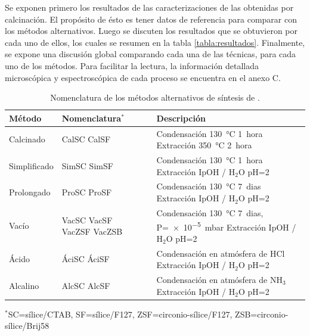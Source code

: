 	 Se exponen primero los resultados de las caracterizaciones de las \pdm\space obtenidas por calcinación. El propósito de ésto es tener datos de referencia para comparar con los métodos alternativos. Luego se discuten los resultados que se obtuvieron por cada uno de ellos, los cuales se resumen en la tabla \ref{tabla:resultados}. Finalmente, se expone una discusión global comparando cada una de las técnicas, para cada uno de los métodos. Para facilitar la lectura, la información detallada microscópica y espectroscópica de cada proceso se encuentra en el anexo C.
	 
	  	 \begin{table}[h!] 
		 	 \caption[Tratamientos alternativos de síntesis de \pdm]{Nomenclatura de los métodos alternativos de síntesis de \pdm.}
			 \begin{tabular}{>{\raggedright\arraybackslash}m{1.9cm}>{\centering\arraybackslash}m{1cm}>{\raggedright\arraybackslash}m{0.9cm}>{\raggedright\arraybackslash}m{6.62cm}} 
			 \toprule
				 Método   &  Nomenclatura$^*$&  & Descripción \\ \midrule
				 Calcinado & CalSC CalSF& &  Condensación \SI{130}{\celsius} \SI{1}{hora}\hspace{2cm} Extracción \SI{350}{\celsius} \SI{2}{hora}\hspace{2cm} \\ \midrule
				 Simplificado & SimSC SimSF& &  Condensación \SI{130}{\celsius} \SI{1}{hora}\hspace{2cm} Extracción IpOH / H$_2$O pH=2 \\ \midrule
				 Prolongado & ProSC ProSF& & Condensación \SI{130}{\celsius} \SI{7}{dias}\hspace{2cm} Extracción IpOH / H$_2$O pH=2 \\ \midrule				
				 Vacío & VacSC VacSF VacZSF VacZSB& &  Condensación \SI{130}{\celsius} \SI{7}{dias}, P=\SI{e-5}{\milli\bar}\hspace{2cm} Extracción IpOH / H$_2$O pH=2 \\ \midrule
				 Ácido & ÁciSC ÁciSF& &  Condensación en atmósfera de HCl\hspace{2cm} Extracción IpOH / H$_2$O pH=2 \\ \midrule
				 Alcalino & AlcSC AlcSF& & Condensación en atmósfera de NH$_3$\hspace{2cm} Extracción IpOH / H$_2$O pH=2 \\ 
				\bottomrule
				   \end{tabular}\vspace*{2pt}
		    	  	\footnotesize{$^*$SC=sílice/CTAB, SF=sílice/F127, ZSF=circonio-sílice/F127, ZSB=circonio-sílice/Brij58}
				   	\label{tabla:tratamientos}
				   \end{table}
	

